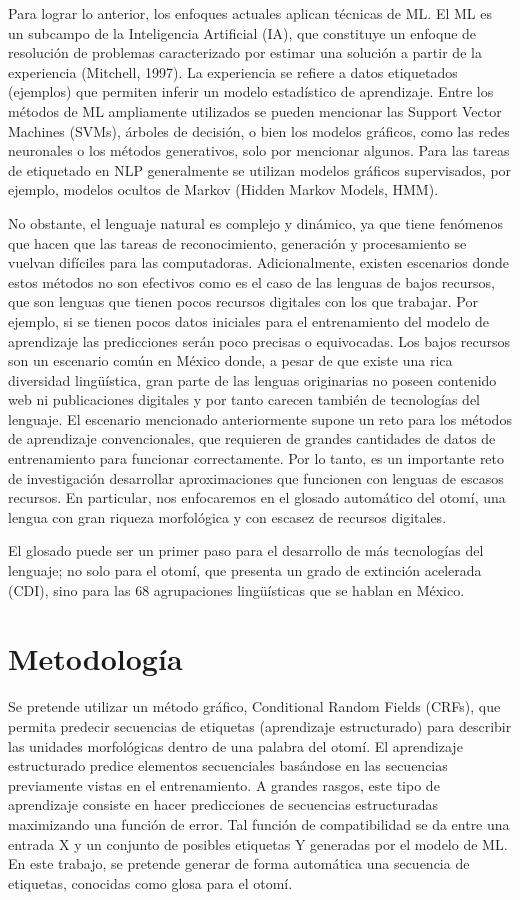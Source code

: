 \documentclass{article}
\begin{document}
Para lograr lo anterior, los enfoques actuales aplican técnicas de ML. El ML es
un subcampo de la Inteligencia Artificial (IA), que constituye un enfoque de
resolución de problemas caracterizado por estimar una solución a partir de la
experiencia (Mitchell, 1997).  La experiencia se refiere a datos etiquetados
(ejemplos) que permiten inferir un modelo estadístico de aprendizaje. Entre los
métodos de ML ampliamente utilizados se pueden mencionar las Support Vector
Machines (SVMs), árboles de decisión, o bien los modelos gráficos, como las
redes neuronales o los métodos generativos, solo por mencionar algunos. Para
las tareas de etiquetado en NLP generalmente se utilizan modelos gráficos
supervisados, por ejemplo, modelos ocultos de Markov (Hidden Markov Models,
HMM).

No obstante, el lenguaje natural es complejo y dinámico, ya que tiene fenómenos
que hacen que las tareas de reconocimiento, generación y procesamiento se
vuelvan difíciles para las computadoras. Adicionalmente, existen escenarios
donde estos métodos no son efectivos como es el caso de las lenguas de bajos
recursos, que son lenguas que tienen pocos recursos digitales con los que
trabajar. Por ejemplo, si se tienen pocos datos iniciales para el entrenamiento
del modelo de aprendizaje las predicciones serán poco precisas o equivocadas.
Los bajos recursos son un escenario común en México donde, a pesar de que
existe una rica diversidad lingüística, gran parte de las lenguas originarias
no poseen contenido web ni publicaciones digitales y por tanto carecen también
de tecnologías del lenguaje.  El escenario mencionado anteriormente supone un
reto para los métodos de aprendizaje convencionales, que requieren de grandes
cantidades de datos de entrenamiento para funcionar correctamente. Por lo
tanto, es un importante reto de investigación desarrollar aproximaciones que
funcionen con lenguas de escasos recursos. En particular, nos enfocaremos en el
glosado automático del  otomí, una lengua con gran riqueza morfológica y con
escasez de recursos digitales.

El glosado puede ser un primer paso para el desarrollo de más tecnologías del
lenguaje; no solo para el otomí, que presenta un grado de extinción acelerada
(CDI), sino para las 68 agrupaciones lingüísticas que se hablan en México.

\section{Metodología}
Se pretende utilizar un método gráfico, Conditional Random Fields (CRFs), que
permita predecir secuencias de etiquetas (aprendizaje estructurado) para
describir las unidades morfológicas dentro de una palabra del otomí. El
aprendizaje estructurado predice elementos secuenciales basándose en las
secuencias previamente vistas en el entrenamiento. A grandes rasgos, este tipo
de aprendizaje consiste en hacer predicciones de secuencias estructuradas
maximizando una función de error. Tal función de compatibilidad se da entre una
entrada X y un conjunto de posibles etiquetas Y generadas por el modelo de ML.
En este trabajo, se pretende generar de forma automática una secuencia de
etiquetas, conocidas como glosa para el otomí. 
\end{document}
